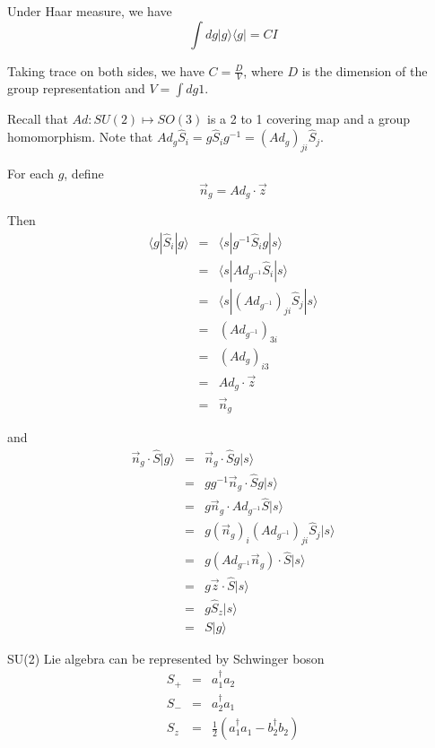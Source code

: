 \documentclass[12pt]{book}
\begin{document}
	Under Haar measure, we have
	\begin{equation}
		\int dg|g\rangle\langle g|=CI
	\end{equation}
	
	Taking trace on both sides, we have $C=\frac D V$, where $D$ is the dimension of the group representation and $V=\int dg1$.
	
	Recall that $Ad:SU(2)\mapsto SO(3)$ is a 2 to 1 covering map and a group homomorphism. Note that $Ad_g \hat S_i=g\hat S_ig^{-1}=(Ad_g)_{ji}\hat S_j$.
	
	For each $g$, define 
	\begin{equation}
		\vec n_g=Ad_g \cdot \vec z
	\end{equation}
	
	Then
	\begin{eqnarray}
		\langle g|\hat S_i|g\rangle &=& \langle s|g^{-1}\hat S_i g|s\rangle\\
		&=&\langle s|Ad_{g^{-1}}\hat S_i|s\rangle\\
		&=&\langle s|(Ad_{g^{-1}})_{ji}\hat S_j|s\rangle\\
		&=&(Ad_{g^{-1}})_{3i}\\
		&=&(Ad_{g})_{i3}\\
		&=&Ad_{g} \cdot \vec z\\
		&=&\vec n_g
	\end{eqnarray}
	
	and
	\begin{eqnarray}
		\vec n_g\cdot \hat S|g\rangle&=&\vec n_g\cdot \hat S g|s\rangle\\
		&=&g g^{-1}\vec n_g\cdot \hat S g|s\rangle\\
		&=&g \vec n_g\cdot Ad_{g^{-1}}\hat S |s\rangle\\
		&=&g (\vec n_g)_i(Ad_{g^{-1}})_{ji}\hat S_j |s\rangle\\
		&=&g (Ad_{g^{-1}}\vec n_g)\cdot \hat S |s\rangle\\
		&=&g \vec z\cdot \hat S |s\rangle\\
		&=&g \hat S_z |s\rangle\\
		&=&S|g\rangle
	\end{eqnarray}
	
	SU(2) Lie algebra can be represented by Schwinger boson
	\begin{eqnarray}
		S_+&=&a_1^\dagger a_2\\
		S_-&=&a_2^\dagger a_1\\
		S_z&=&\frac 12(a_1^\dagger a_1-b_2^\dagger b_2)
	\end{eqnarray}
	
\end{document}
